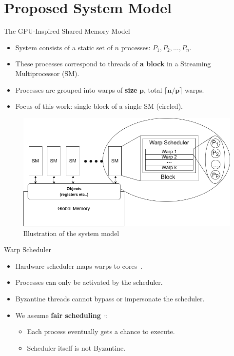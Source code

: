 \documentclass{beamer}
\begin{document}
\section{Proposed System Model}


\begin{frame}{The GPU-Inspired Shared Memory Model}
\begin{itemize}
  \item System consists of a static set of $n$ processes: $P_1, P_2, \dots, P_n$.
  \item These processes correspond to threads of \textbf{a block} in a Streaming Multiprocessor (SM).
  \item Processes are grouped into warps of \textbf{size} $\boldsymbol{p}$, total $\boldsymbol{\lceil n/p \rceil}$ warps.  
  \item Focus of this work: single block of a single SM (circled).
\end{itemize}
\vspace{-1em}
\begin{figure}[t]
\centering
\includegraphics[scale=0.25]{BYZmodel.png}
\caption{Illustration of the system model}
\vspace{-2em}
\label{fig:SysModel}
\end{figure}
\end{frame}

\begin{frame}{Warp Scheduler}
\begin{itemize}
  \item Hardware scheduler maps warps to cores~.
  \item Processes can only be activated by the scheduler.
  \item Byzantine threads cannot bypass or impersonate the scheduler.
  \item We assume \textbf{fair scheduling}~$^,$:
    \begin{itemize}
      \item Each process eventually gets a chance to execute.
      \item Scheduler itself is not Byzantine.
    \end{itemize}
\end{itemize}
\end{frame}
\end{document}
